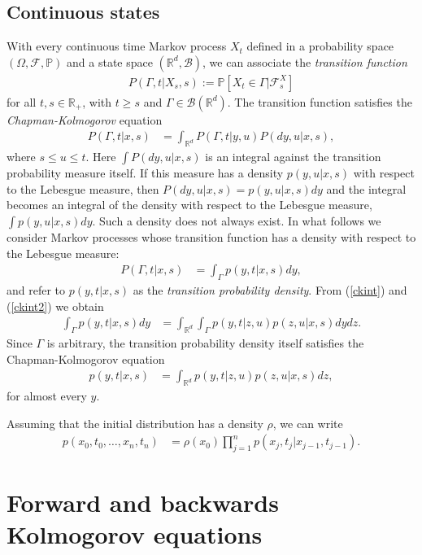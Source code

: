 \documentclass[11pt]{article}
\begin{document}
\subsection{Continuous states}
With every continuous time Markov process $X_t$ defined in a probability space $(\Omega,\mathcal{F},\mathbb{P})$ and a state space $(\mathbb{R}^d,\mathcal{B})$, we can associate the {\it transition function} \cite{pavliotis}
\begin{align}
  P(\Gamma,t|X_s,s):=\mathbb{P}[X_t\in\Gamma|\mathcal{F}^X_s]
\end{align}
for all $t,s\in\mathbb{R}_+$, with $t\geq s$ and $\Gamma\in\mathcal{B}(\mathbb{R}^d)$. The transition function satisfies the {\it Chapman-Kolmogorov} equation
\begin{align}
  P(\Gamma,t|x,s)&=\int_{\mathbb{R}^d}P(\Gamma,t|y,u)P(dy,u|x,s),
  \label{ckint}
\end{align}
where $s\leq u\leq t$. Here $\int P(dy,u|x,s)$ is an integral against the transition probability measure itself. If this measure has a density $p(y,u|x,s)$ with respect to the Lebesgue measure, then $P(dy,u|x,s)=p(y,u|x,s)dy$ and the integral becomes an integral of the density with respect to the Lebesgue measure, $\int p(y,u|x,s)dy$. Such a density does not always exist. In what follows we consider Markov processes whose transition function has a density with respect to the Lebesgue measure:
\begin{align}
  P(\Gamma,t|x,s)&=\int_{\Gamma}p(y,t|x,s)dy,
  \label{ckint2}
\end{align}
and refer to $p(y,t|x,s)$ as the {\it transition probability density}. From (\ref{ckint}) and (\ref{ckint2}) we obtain
\begin{align}
  \int_{\Gamma}p(y,t|x,s)dy&=\int_{\mathbb{R}^d}\int_{\Gamma}p(y,t|z,u)p(z,u|x,s)dydz.
\end{align}
Since $\Gamma$ is arbitrary, the transition probability density itself satisfies the Chapman-Kolmogorov equation
\begin{align}
  p(y,t|x,s)&=\int_{\mathbb{R}^d}p(y,t|z,u)p(z,u|x,s)dz,
\end{align}
for almost every $y$.

Assuming that the initial distribution has a density $\rho$, we can write
\begin{align}
  p(x_0,t_0,\dots,x_n,t_n)&=\rho(x_0)\prod_{j=1}^np(x_j,t_j|x_{j-1},t_{j-1}).
\end{align}


\section{Forward and backwards Kolmogorov equations}
\end{document}
